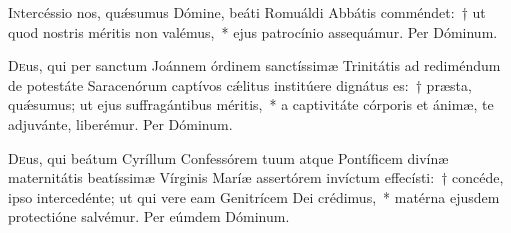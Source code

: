 \documentclass[vesperale_romanum.tex]{subfiles}
\begin{document}
\myrule



\myrule


\duplexmtv

\oratio

\lettrine{I}{n}tercéssio nos, quǽsumus Dómine, beáti Romuáldi Abbátis comméndet:~† ut quod nostris méritis non valémus,~* ejus patrocínio assequámur. Per Dóminum.


\capitdeseqquad

\myrule


\duplexmtv

\oratio

\lettrine{D}{e}us, qui per san\-ctum Joánnem órdinem san\-ctíssimæ Trinitátis ad rediméndum de potestáte Saracenórum ca\-ptívos cǽlitus institúere dignátus es:~† præsta, quǽsumus; ut ejus suffragántibus méritis,~* a ca\-ptivitáte córporis et ánimæ, te adjuvánte, liberémur.
Per Dóminum.



\myrule


\duplexmtv


\oratio

 \lettrine{D}{e}us, qui beátum Cyríllum Confessórem tuum atque Pontíficem divínæ maternitátis beatíssimæ Vírginis Maríæ assertórem inví\-ctum effecísti:~† concéde, i\-pso intercedénte; ut qui vere eam Genitrícem Dei crédimus,~* matérna ejusdem prote\-ctióne salvémur.
Per eúmdem Dóminum.

\end{document}
